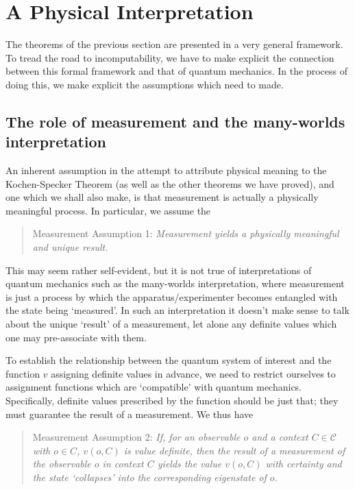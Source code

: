 \documentclass[11pt, a4paper]{article}
\theoremstyle{definition}
\begin{document}
\section{A Physical Interpretation}
\label{sec:interpretation}

The theorems of the previous section are presented in a very general framework.
To tread the road to incomputability, we have to make explicit the connection between this formal framework and that of quantum mechanics.
In the process of doing this, we make explicit the assumptions which need to made.

\subsection{The role of measurement and the many-worlds interpretation}

An inherent assumption in the attempt to attribute physical meaning to the Kochen-Specker Theorem (as well as the other theorems we have proved), and one which we shall also make, is that measurement is actually a physically meaningful process.
In particular, we assume the

\begin{quote} Measurement Assumption 1: {\em Measurement yields a physically meaningful and unique result.}
\end{quote}

This may seem rather self-evident, but it is not true of interpretations of quantum mechanics such as the many-worlds interpretation, where measurement is just a process by which the apparatus/experimenter becomes entangled with the state being `measured'.
In such an interpretation it doesn't make sense to talk about the unique `result' of a measurement, let alone any definite values which one may pre-associate with them.

To establish the relationship between the quantum system of interest and the function $v$ assigning definite values in advance, we need to restrict ourselves to assignment functions which are `compatible' with quantum mechanics.
Specifically, definite values prescribed by the function should be just that; they must guarantee the result of a measurement. We thus have

\begin{quote} Measurement Assumption 2: {\em If, for an observable $o$ and a context $C\in\mathcal{C}$ with $o\in C$, $v(o,C)$ is value definite, then the result of a measurement of the observable $o$ in context $C$ yields the value $v(o,C)$ with certainty and the state `collapses' into the corresponding eigenstate of $o$.}
\end{quote}
\end{document}
